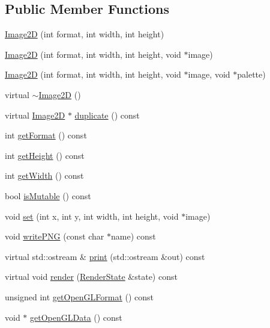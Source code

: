 \subsection*{Public Member Functions}
\begin{CompactItemize}
\item 
\hyperlink{classm3g_1_1Image2D_cea21be298c6584490d2b714c4b29d6b}{Image2D} (int format, int width, int height)
\item 
\hyperlink{classm3g_1_1Image2D_8cf9a47f24ed50fe66686c1117fb048c}{Image2D} (int format, int width, int height, void $\ast$image)
\item 
\hyperlink{classm3g_1_1Image2D_f498914ceac20ff9b1708c55ff1484e6}{Image2D} (int format, int width, int height, void $\ast$image, void $\ast$palette)
\item 
virtual \hyperlink{classm3g_1_1Image2D_7ac703fe7edbb053dd2246ea1bb43200}{$\sim$Image2D} ()
\item 
virtual \hyperlink{classm3g_1_1Image2D}{Image2D} $\ast$ \hyperlink{classm3g_1_1Image2D_47eefc8e0b0b3d4c5b16b3f57285fe6b}{duplicate} () const 
\item 
int \hyperlink{classm3g_1_1Image2D_c08e2752176d267cc4429d4d185975b8}{getFormat} () const 
\item 
int \hyperlink{classm3g_1_1Image2D_317329daf960a1759801c0f16d43d5a3}{getHeight} () const 
\item 
int \hyperlink{classm3g_1_1Image2D_f149cb053bc8b5fbc1364b5dbb934488}{getWidth} () const 
\item 
bool \hyperlink{classm3g_1_1Image2D_d687aabba553d1c66bfc253ec7e5bd05}{isMutable} () const 
\item 
void \hyperlink{classm3g_1_1Image2D_fe9ef1abefb9e92b38687e27c9004bdc}{set} (int x, int y, int width, int height, void $\ast$image)
\item 
void \hyperlink{classm3g_1_1Image2D_8957959000d658fd8a3cff474f7ee7e8}{writePNG} (const char $\ast$name) const 
\item 
virtual std::ostream \& \hyperlink{classm3g_1_1Image2D_6fea17fa1532df3794f8cb39cb4f911f}{print} (std::ostream \&out) const 
\item 
virtual void \hyperlink{classm3g_1_1Image2D_8babc8a79b78615da51161e94029eea9}{render} (\hyperlink{structm3g_1_1RenderState}{RenderState} \&state) const 
\item 
unsigned int \hyperlink{classm3g_1_1Image2D_3e28ae5596cde78a980de02005a136f2}{getOpenGLFormat} () const 
\item 
void $\ast$ \hyperlink{classm3g_1_1Image2D_b837b1bdda59947a6d818c448965c502}{getOpenGLData} () const 
\end{CompactItemize}
